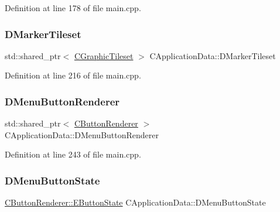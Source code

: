 Definition at line 178 of file main.\+cpp.

\hypertarget{classCApplicationData_ae9f336696b810bff2353d731300ec9d7}{}\label{classCApplicationData_ae9f336696b810bff2353d731300ec9d7} 
\subsubsection{\texorpdfstring{D\+Marker\+Tileset}{DMarkerTileset}}
{\footnotesize\ttfamily std\+::shared\+\_\+ptr$<$ \hyperlink{classCGraphicTileset}{C\+Graphic\+Tileset} $>$ C\+Application\+Data\+::\+D\+Marker\+Tileset\hspace{0.3cm}{\ttfamily [protected]}}



Definition at line 216 of file main.\+cpp.

\hypertarget{classCApplicationData_a2c9f10aa452454a016e0164f6ce777a6}{}\label{classCApplicationData_a2c9f10aa452454a016e0164f6ce777a6} 
\subsubsection{\texorpdfstring{D\+Menu\+Button\+Renderer}{DMenuButtonRenderer}}
{\footnotesize\ttfamily std\+::shared\+\_\+ptr$<$ \hyperlink{classCButtonRenderer}{C\+Button\+Renderer} $>$ C\+Application\+Data\+::\+D\+Menu\+Button\+Renderer\hspace{0.3cm}{\ttfamily [protected]}}



Definition at line 243 of file main.\+cpp.

\hypertarget{classCApplicationData_a92e86e12efc0c3246550b3043b892bea}{}\label{classCApplicationData_a92e86e12efc0c3246550b3043b892bea} 
\subsubsection{\texorpdfstring{D\+Menu\+Button\+State}{DMenuButtonState}}
{\footnotesize\ttfamily \hyperlink{classCButtonRenderer_ae0eccda184600f6e14bfd59033e5e9a1}{C\+Button\+Renderer\+::\+E\+Button\+State} C\+Application\+Data\+::\+D\+Menu\+Button\+State\hspace{0.3cm}{\ttfamily [protected]}}



